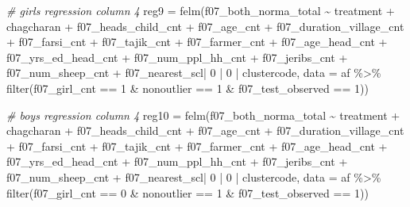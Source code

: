 \documentclass[
]{article}
\newenvironment{Shaded}{\begin{snugshade}}{\end{snugshade}}
\newcommand{\AttributeTok}[1]{\textcolor[rgb]{0.77,0.63,0.00}{#1}}
\newcommand{\CommentTok}[1]{\textcolor[rgb]{0.56,0.35,0.01}{\textit{#1}}}
\newcommand{\DecValTok}[1]{\textcolor[rgb]{0.00,0.00,0.81}{#1}}
\newcommand{\FunctionTok}[1]{\textcolor[rgb]{0.00,0.00,0.00}{#1}}
\newcommand{\NormalTok}[1]{#1}
\newcommand{\OtherTok}[1]{\textcolor[rgb]{0.56,0.35,0.01}{#1}}
\newcommand{\SpecialCharTok}[1]{\textcolor[rgb]{0.00,0.00,0.00}{#1}}
\begin{document}
\begin{Shaded}
\begin{Highlighting}[]
\CommentTok{\# girls regression column 4}
\NormalTok{reg9 }\OtherTok{=} \FunctionTok{felm}\NormalTok{(f07\_both\_norma\_total }\SpecialCharTok{\textasciitilde{}}\NormalTok{ treatment }\SpecialCharTok{+}\NormalTok{ chagcharan }\SpecialCharTok{+}\NormalTok{ f07\_heads\_child\_cnt }\SpecialCharTok{+} 
\NormalTok{              f07\_age\_cnt }\SpecialCharTok{+}\NormalTok{ f07\_duration\_village\_cnt }\SpecialCharTok{+} 
\NormalTok{              f07\_farsi\_cnt }\SpecialCharTok{+}\NormalTok{ f07\_tajik\_cnt }\SpecialCharTok{+}\NormalTok{ f07\_farmer\_cnt }\SpecialCharTok{+} 
\NormalTok{              f07\_age\_head\_cnt }\SpecialCharTok{+}\NormalTok{ f07\_yrs\_ed\_head\_cnt }\SpecialCharTok{+}\NormalTok{ f07\_num\_ppl\_hh\_cnt }\SpecialCharTok{+} 
\NormalTok{              f07\_jeribs\_cnt }\SpecialCharTok{+}\NormalTok{ f07\_num\_sheep\_cnt }\SpecialCharTok{+} 
\NormalTok{              f07\_nearest\_scl}\SpecialCharTok{|} \DecValTok{0} \SpecialCharTok{|} \DecValTok{0} \SpecialCharTok{|}\NormalTok{ clustercode, }
            \AttributeTok{data =}\NormalTok{ af }\SpecialCharTok{\%\textgreater{}\%} \FunctionTok{filter}\NormalTok{(f07\_girl\_cnt }\SpecialCharTok{==} \DecValTok{1} \SpecialCharTok{\&} 
\NormalTok{                                 nonoutlier }\SpecialCharTok{==} \DecValTok{1} \SpecialCharTok{\&}
\NormalTok{                                 f07\_test\_observed }\SpecialCharTok{==} \DecValTok{1}\NormalTok{))}

\CommentTok{\# boys regression column 4}
\NormalTok{reg10 }\OtherTok{=} \FunctionTok{felm}\NormalTok{(f07\_both\_norma\_total }\SpecialCharTok{\textasciitilde{}}\NormalTok{ treatment }\SpecialCharTok{+}\NormalTok{ chagcharan }\SpecialCharTok{+}\NormalTok{ f07\_heads\_child\_cnt }\SpecialCharTok{+} 
\NormalTok{              f07\_age\_cnt }\SpecialCharTok{+}\NormalTok{ f07\_duration\_village\_cnt }\SpecialCharTok{+} 
\NormalTok{              f07\_farsi\_cnt }\SpecialCharTok{+}\NormalTok{ f07\_tajik\_cnt }\SpecialCharTok{+}\NormalTok{ f07\_farmer\_cnt }\SpecialCharTok{+} 
\NormalTok{              f07\_age\_head\_cnt }\SpecialCharTok{+}\NormalTok{ f07\_yrs\_ed\_head\_cnt }\SpecialCharTok{+}\NormalTok{ f07\_num\_ppl\_hh\_cnt }\SpecialCharTok{+} 
\NormalTok{              f07\_jeribs\_cnt }\SpecialCharTok{+}\NormalTok{ f07\_num\_sheep\_cnt }\SpecialCharTok{+} 
\NormalTok{              f07\_nearest\_scl}\SpecialCharTok{|} \DecValTok{0} \SpecialCharTok{|} \DecValTok{0} \SpecialCharTok{|}\NormalTok{ clustercode, }
            \AttributeTok{data =}\NormalTok{ af }\SpecialCharTok{\%\textgreater{}\%} \FunctionTok{filter}\NormalTok{(f07\_girl\_cnt }\SpecialCharTok{==} \DecValTok{0} \SpecialCharTok{\&} 
\NormalTok{                                 nonoutlier }\SpecialCharTok{==} \DecValTok{1} \SpecialCharTok{\&}
\NormalTok{                                 f07\_test\_observed }\SpecialCharTok{==} \DecValTok{1}\NormalTok{))}
\end{Highlighting}
\end{Shaded}
\end{document}

